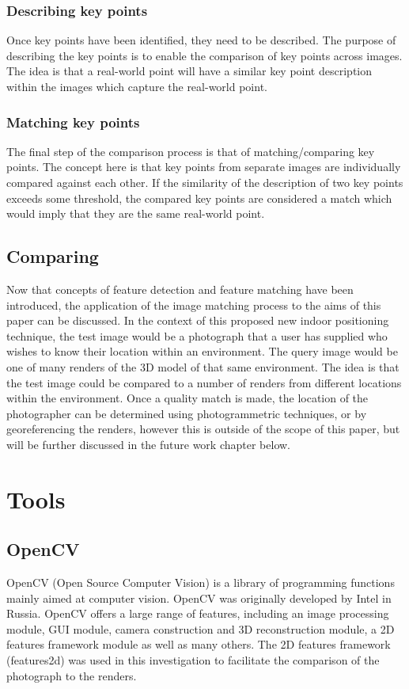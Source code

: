 \documentclass[11pt,a4paper]{report}
\begin{document}
			\subsubsection{Describing key points}
				Once key points have been identified, they need to be described. The purpose of describing the key points is to enable the comparison of key points across images. The idea is that a real-world point will have a similar key point description within the images which capture the real-world point.
				
			\subsubsection{Matching key points}
				The final step of the comparison process is that of matching/comparing key points. The concept here is that key points from separate images are individually compared against each other. If the similarity of the description of two key points exceeds some threshold, the compared key points are considered a match which would imply that they are the same real-world point.
		
		\subsection{Comparing}
			Now that concepts of feature detection and feature matching have been introduced, the application of the image matching process to the aims of this paper can be discussed.
			In the context of this proposed new indoor positioning technique, the test image would be a photograph that a user has supplied who wishes to know their location within an environment. The query image would be one of many renders of the 3D model of that same environment.
			The idea is that the test image could be compared to a number of renders from different locations within the environment. Once a quality match is made, the location of the photographer can be determined using photogrammetric techniques, or by georeferencing the renders, however this is outside of the scope of this paper, but will be further discussed in the future work chapter below.
	
	\section{Tools}
		\subsection{OpenCV}
			OpenCV (Open Source Computer Vision) is a library of programming functions mainly aimed at computer vision. OpenCV was originally developed by Intel in Russia. OpenCV offers a large range of features, including an image processing module, GUI module, camera construction and 3D reconstruction module, a 2D features framework module as well as many others. The 2D features framework (features2d) was used in this investigation to facilitate the comparison of the photograph to the renders. 
\end{document}
